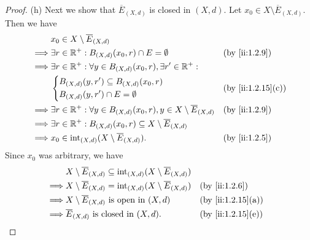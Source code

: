 \begin{proof}{(h)}
  Next we show that \(\overline{E}_{(X, d)}\) is closed in \((X, d)\).
  Let \(x_0 \in X \setminus \overline{E}_{(X, d)}\).
  Then we have
  \begin{align*}
             & x_0 \in X \setminus \overline{E}_{(X, d)}                                                                         \\
    \implies & \exists r \in \R^+ : B_{(X, d)}(x_0, r) \cap E = \emptyset                                     &  & \by{ii:1.2.9} \\
    \implies & \exists r \in \R^+ : \forall y \in B_{(X, d)}(x_0, r), \exists r' \in \R^+ :                                      \\
             & \begin{dcases}
                 B_{(X, d)}(y, r') \subseteq B_{(X, d)}(x_0, r) \\
                 B_{(X, d)}(y, r') \cap E = \emptyset
               \end{dcases}                                              &  & \by{ii:1.2.15}[c]                                  \\
    \implies & \exists r \in \R^+ : \forall y \in B_{(X, d)}(x_0, r), y \in X \setminus \overline{E}_{(X, d)} &  & \by{ii:1.2.9} \\
    \implies & \exists r \in \R^+ : B_{(X, d)}(x_0, r) \subseteq X \setminus \overline{E}_{(X, d)}                               \\
    \implies & x_0 \in \text{int}_{(X, d)}(X \setminus \overline{E}_{(X, d)}).                                &  & \by{ii:1.2.5}
  \end{align*}
  Since \(x_0\) was arbitrary, we have
  \begin{align*}
             & X \setminus \overline{E}_{(X, d)} \subseteq \text{int}_{(X, d)}(X \setminus \overline{E}_{(X, d)})                        \\
    \implies & X \setminus \overline{E}_{(X, d)} = \text{int}_{(X, d)}(X \setminus \overline{E}_{(X, d)})         &  & \by{ii:1.2.6}     \\
    \implies & X \setminus \overline{E}_{(X, d)} \text{ is open in } (X, d)                                       &  & \by{ii:1.2.15}[a] \\
    \implies & \overline{E}_{(X, d)} \text{ is closed in } (X, d).                                                &  & \by{ii:1.2.15}[e]
  \end{align*}


\end{proof}
